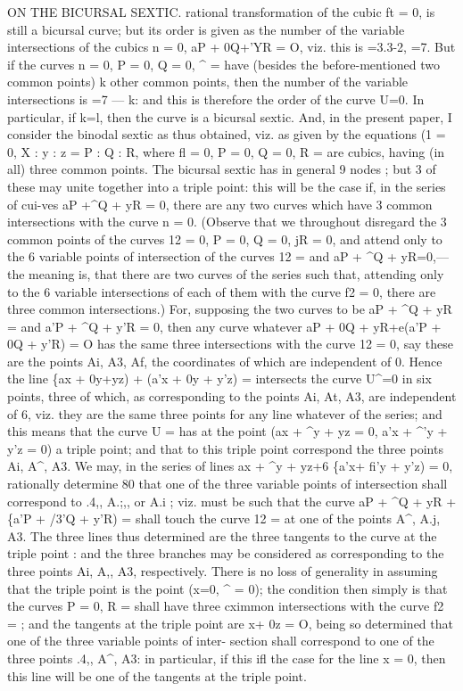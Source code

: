 \documentclass[11pt,a4paper]{book}
\begin{document}
ON THE BICURSAL SEXTIC.
rational
transformation
of
the
cubic
ft = 0,
is
still
a
bicursal
curve;
but
its
order
is
given as the number of the
variable
intersections of the cubics
n = 0,
aP + 0Q+'YR = O,
viz.
this
is =3.3-2, =7.
But
if the
curves n = 0, P = 0, Q = 0, \textasciicircum{} =
have (besides
the
before-mentioned
two common
points) k other common
points,
then
the number
of
the
variable
intersections
is =7 --- k:
and
this
is
therefore
the
order
of
the
curve
U=0.
In
particular,
if k=l, then the
curve
is a bicursal
sextic.
And,
in
the present
paper, I
consider
the
binodal
sextic
as
thus
obtained,
viz.
as
given by
the
equations
(1 = 0, X
: y
: z = P
: Q
: R, where
fl = 0, P = 0, Q = 0, R =
are cubics, having (in
all)
three common
points.
The
bicursal
sextic
has
in
general
9
nodes
;
but
3
of
these may
unite
together
into
a
triple
point:
this
will
be
the
case
if,
in the
series of
cui-ves aP +\textasciicircum{}Q + yR = 0,
there
are
any
two
curves
which
have
3 common
intersections
with
the
curve n = 0.
(Observe
that we
throughout
disregard
the
3
common
points
of
the
curves
12 = 0,
P = 0, Q = 0, jR = 0, and attend only to the 6
variable points of intersection of the curves
12 =
and aP + \textasciicircum{}Q + yR=0,--- the
meaning
is,
that
there
are
two
curves
of the
series
such
that,
attending
only
to
the
6
variable
intersections
of
each
of
them
with
the
curve
f2 = 0,
there
are
three common
intersections.)
For, supposing
the
two
curves
to
be aP + \textasciicircum{}Q + yR =
and a'P + \textasciicircum{}Q + y'R = 0, then any curve whatever
aP + 0Q + yR+e(a'P + 0Q + y'R) = O
has
the
same
three
intersections
with
the
curve
12 = 0,
say
these
are
the
points
Ai, A3, Af,
the coordinates
of which are independent
of
0.
Hence
the
line
\{ax + 0y+yz) +
(a'x + 0y + y'z) =
intersects
the
curve
U\textasciicircum{}=0
in
six
points,
three of
which, as corresponding
to the points
Ai,
At,
A3,
are
independent
of
6,
viz.
they
are
the
same
three
points
for
any
line
whatever of the
series;
and
this means
that the curve U =
has at the point
(ax + \textasciicircum{}y + yz = 0,
a'x + \textasciicircum{}'y + y'z = 0)
a
triple point;
and that
to
this
triple
point correspond the three points Ai, A\textasciicircum{}, A3.
We may, in the series of lines ax + \textasciicircum{}y + yz+6 \{a'x+ fi'y + y'z) = 0, rationally determine
80
that
one
of the
three
variable
points
of
intersection
shall
correspond
to
.4,,
A.;,,
or
A.i
;
viz.
must be such
that
the
curve aP + \textasciicircum{}Q + yR +
\{a'P + /3'Q + y'R) =
shall
touch the curve
12 =
at one
of the points A\textasciicircum{}, A.j, A3.
The three
lines thus determined
are the
three
tangents
to
the
curve
at
the
triple point
:
and
the
three branches may
be considered as corresponding to the three points Ai, A,, A3, respectively.
There
is
no
loss
of
generality
in
assuming
that
the
triple
point
is
the
point
(x=0,
\textasciicircum{} = 0);
the
condition
then
simply
is
that
the
curves P = 0, R =
shall
have
three
cximmon
intersections with
the
curve
f2 =
;
and the tangents at the
triple
point
are x+ 0z = O,
being
so
determined
that
one
of the
three
variable
points
of
inter-
section
shall
correspond
to
one
of the
three
points
.4,,
A\textasciicircum{},
A3:
in
particular,
if
this
ifl
the
case
for
the
line
x = 0,
then
this
line
will
be
one
of
the
tangents
at
the
triple
point.
\end{document}
